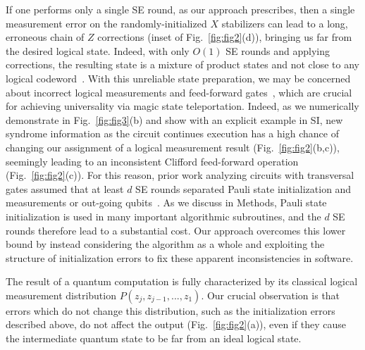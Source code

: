 \documentclass[prl,twocolumn,superscriptaddress,secnumarabic,balancelastpage,amsmath,amssymb]{revtex4-2}
\begin{document}
If one performs only a single SE round, as our approach prescribes, then a single measurement error on the randomly-initialized $X$ stabilizers can lead to a long, erroneous chain of $Z$ corrections (inset of Fig.~\ref{fig:fig2}(d)), bringing us far from the desired logical state.
%
Indeed, with only $O(1)$ SE rounds and applying corrections, the resulting state is a mixture of product states and not close to any logical codeword~\cite{hastings2011topological}.
%
With this unreliable state preparation, we may be concerned about incorrect logical measurements and feed-forward gates~\cite{haah2024what}, which are crucial for achieving universality via magic state teleportation.
%
Indeed, as we numerically demonstrate in Fig.~\ref{fig:fig3}(b) and show with an explicit example in SI, new syndrome information as the circuit continues execution has a high chance of changing our assignment of a logical measurement result (Fig.~\ref{fig:fig2}(b,c)), seemingly leading to an inconsistent Clifford feed-forward operation  (Fig.~\ref{fig:fig2}(c)).
%
For this reason, prior work analyzing circuits with transversal gates assumed that at least $d$ SE rounds separated Pauli state initialization and measurements or out-going qubits~\cite{beverland2021cost,cai2023looped,duckering2020virtualized}.
%
As we discuss in Methods, Pauli state initialization is used in many important algorithmic subroutines, and the $d$ SE rounds therefore lead to a substantial cost.
%
Our approach overcomes this lower bound by instead considering the algorithm as a whole and exploiting the structure of initialization errors to fix these apparent inconsistencies in software.

The result of a quantum computation is fully characterized by its classical logical measurement distribution $P(z_j,z_{j-1},...,z_1)$.
%
Our crucial observation is that errors which do not change this distribution, such as the initialization errors described above, do not affect the output (Fig.~\ref{fig:fig2}(a)), even if they cause the intermediate quantum state to be far from an ideal logical state.
\end{document}
